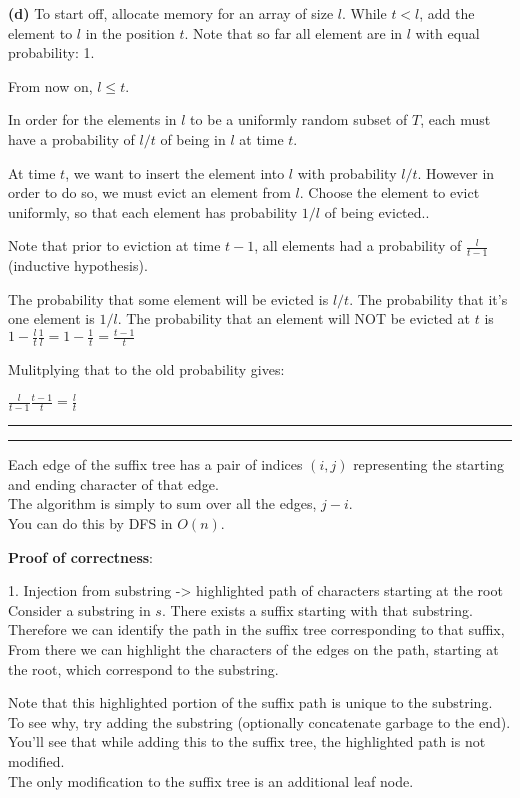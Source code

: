 \documentclass[11pt]{article}
\newcommand{\question}[2] {\vspace{.25in} \hrule\vspace{0.5em}
\noindent{\bf #1: #2} \vspace{0.5em}
\hrule \vspace{.10in}}
\renewcommand{\part}[1] {\vspace{.10in} {\bf (#1)}}
\begin{document}
\part{d}
To start off, allocate memory for an array of size $l$.
While $t<l$, add the element to $l$ in the position $t$.
Note that so far all element are in $l$ with equal probability: 1.

From now on, $l \leq t$.

In order for the elements in $l$ to be a uniformly random subset of $T$,
each must have a probability of $l/t$ of being in $l$ at time $t$.

At time $t$, we want to insert the element into $l$ with probability $l/t$.
However in order to do so, we must evict an element from $l$.
Choose the element to evict uniformly, so that each element has probability $1/l$ of being evicted..

Note that prior to eviction at time $t-1$, all elements had a probability of $\frac{l}{t-1}$ (inductive hypothesis).


The probability that some element will be evicted is $l/t$.
The probability that it's one element is $1/l$.
The probability that an element will NOT be evicted at $t$ is $1 - \frac{l}{t} \frac{1}{l} = 1 - \frac{1}{t} = \frac{t-1}{t}$

Mulitplying that to the old probability gives:

$\frac{l}{t-1} \frac{t-1}{t}  = \frac{l}{t}$



\question{2}{Counting Substrings}

Each edge of the suffix tree has a pair of indices $(i,j)$ representing the starting and ending character of that edge.\\
The algorithm is simply to sum over all the edges, $j-i$.\\
You can do this by DFS in $O(n)$.

\textbf{Proof of correctness}:

1. Injection from substring -> highlighted path of characters starting at the root\\
Consider a substring in $s$. There exists a suffix starting with that substring.\\
Therefore we can identify the path in the suffix tree corresponding to that suffix,\\
From there we can highlight the characters of the edges on the path, starting at the root, which correspond to the substring.

Note that this highlighted portion of the suffix path is unique to the substring.\\
To see why, try adding the substring (optionally concatenate garbage to the end).\\
You'll see that while adding this to the suffix tree, the highlighted path is not modified.\\
The only modification to the suffix tree is an additional leaf node.
\end{document}
